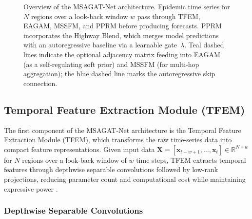 \documentclass[a4paper,fleqn]{cas-dc}
\begin{document}
\begin{figure}[!t]
    \caption{Overview of the MSAGAT-Net architecture. Epidemic time series for $N$ regions over a look-back window $w$ pass through TFEM, EAGAM, MSSFM, and PPRM before producing forecasts. PPRM incorporates the Highway Blend, which merges model predictions with an autoregressive baseline via a learnable gate~$\lambda$. Teal dashed lines indicate the optional adjacency matrix feeding into EAGAM (as a self-regulating soft prior) and MSSFM (for multi-hop aggregation); the blue dashed line marks the autoregressive skip connection.}
    \label{fig:msagat_net_architecture}
\end{figure}

\subsection{Temporal Feature Extraction Module (TFEM)}

The first component of the MSAGAT-Net architecture is the Temporal Feature Extraction Module (TFEM), which transforms the raw time-series data into compact feature representations. Given input data $\mathbf{X} = [\mathbf{x}_{t-w+1}, \ldots, \mathbf{x}_t] \in \mathbb{R}^{N \times w}$ for $N$ regions over a look-back window of $w$ time steps, TFEM extracts temporal features through depthwise separable convolutions \cite{chollet2017xception} followed by low-rank projections, reducing parameter count and computational cost while maintaining expressive power \cite{li2023multi, yu2022traffic}.

\subsubsection{Depthwise Separable Convolutions}
\end{document}
